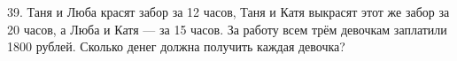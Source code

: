 39. Таня и Люба красят забор за 12 часов, Таня и Катя выкрасят этот же забор за 20 часов, а Люба и Катя --- за 15 часов. За работу всем трём девочкам заплатили 1800 рублей. Сколько денег должна получить каждая девочка?\\
